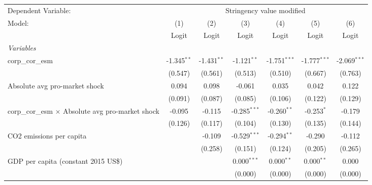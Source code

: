 
\begingroup
\centering
\begin{tabular}{lcccccc}
   \toprule
   Dependent Variable: & \multicolumn{6}{c}{Stringency value modified}\\
   Model:                                                   & (1)           & (2)           & (3)            & (4)            & (5)            & (6)\\  
                                                            &  Logit        & Logit         & Logit          & Logit          & Logit          & Logit\\  
   \midrule
   \emph{Variables}\\
   corp\_cor\_esm                                           & -1.345$^{**}$ & -1.431$^{**}$ & -1.121$^{**}$  & -1.751$^{***}$ & -1.777$^{***}$ & -2.069$^{***}$\\   
                                                            & (0.547)       & (0.561)       & (0.513)        & (0.510)        & (0.667)        & (0.763)\\   
   Absolute avg pro-market shock                            & 0.094         & 0.098         & -0.061         & 0.035          & 0.042          & 0.122\\   
                                                            & (0.091)       & (0.087)       & (0.085)        & (0.106)        & (0.122)        & (0.129)\\   
   corp\_cor\_esm $\times$ Absolute avg pro-market shock    & -0.095        & -0.115        & -0.285$^{***}$ & -0.260$^{**}$  & -0.253$^{*}$   & -0.179\\   
                                                            & (0.126)       & (0.117)       & (0.104)        & (0.130)        & (0.135)        & (0.144)\\   
   CO2 emissions per capita                                 &               & -0.109        & -0.529$^{***}$ & -0.294$^{**}$  & -0.290         & -0.112\\   
                                                            &               & (0.258)       & (0.151)        & (0.124)        & (0.205)        & (0.265)\\   
   GDP per capita (constant 2015 US\$)                      &               &               & 0.000$^{***}$  & 0.000$^{**}$   & 0.000$^{**}$   & 0.000\\   
                                                            &               &               & (0.000)        & (0.000)        & (0.000)        & (0.000)\\   

\end{tabular}
